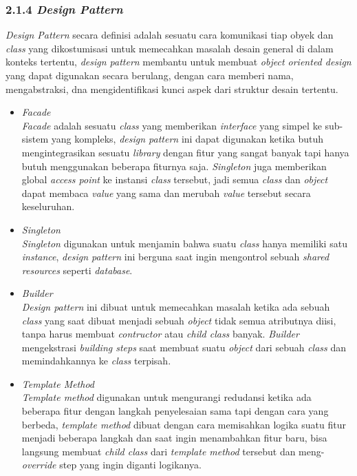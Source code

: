 \documentclass[a4paper]{article}
\newcommand{\subsubbab}[1]{%
    \subsubsection*{#1}%
    \addcontentsline{toc}{subsubsection}{\protect\numberline{}#1}%
}
\begin{document}
\subsubbab{2.1.4 \textit{Design Pattern}}
\textit{Design Pattern} secara definisi adalah sesuatu cara komunikasi tiap obyek dan \textit{class} yang dikostumisasi untuk memecahkan masalah desain general di dalam konteks tertentu, \textit{design pattern} membantu untuk membuat \textit{object oriented design} yang dapat digunakan secara berulang, dengan cara memberi nama, mengabstraksi, dna mengidentifikasi kunci aspek dari struktur desain tertentu\autocite{design-pattern-2588942}.
\begin{itemize}
    \item \textit{Facade}\\
          \textit{Facade} adalah sesuatu \textit{class} yang memberikan \textit{interface} yang simpel ke sub-sistem yang kompleks, \textit{design pattern} ini dapat digunakan ketika butuh mengintegrasikan sesuatu \textit{library} dengan fitur yang sangat banyak tapi hanya butuh menggunakan beberapa fiturnya saja\autocite{refactoring-guru}. \textit{Singleton} juga memberikan global \textit{access point} ke instansi \textit{class} tersebut, jadi semua \textit{class} dan \textit{object} dapat membaca \textit{value} yang sama dan merubah \textit{value} tersebut secara keseluruhan\autocite{refactoring-guru}.
    \item \textit{Singleton}\\
          \textit{Singleton} digunakan untuk menjamin bahwa suatu \textit{class} hanya memiliki satu \textit{instance}, \textit{design pattern} ini berguna saat ingin mengontrol sebuah \textit{shared resources} seperti \textit{database}\autocite{refactoring-guru}.
    \item \textit{Builder}\\
          \textit{Design pattern} ini dibuat untuk memecahkan masalah ketika ada sebuah \textit{class} yang saat dibuat menjadi sebuah \textit{object} tidak semua atributnya diisi, tanpa harus membuat \textit{contructor} atau \textit{child class} banyak. \textit{Builder} mengekstrasi \textit{building steps} saat membuat suatu \textit{object} dari sebuah \textit{class} dan memindahkannya ke \textit{class} terpisah\autocite{refactoring-guru}.
    \item \textit{Template Method}\\
          \textit{Template method} digunakan untuk mengurangi redudansi ketika ada beberapa fitur dengan langkah penyelesaian sama tapi dengan cara yang berbeda, \textit{template method} dibuat dengan cara memisahkan logika suatu fitur menjadi beberapa langkah dan saat ingin menambahkan fitur baru, bisa langsung membuat \textit{child class} dari \textit{template method} tersebut dan meng-\textit{override} step yang ingin diganti logikanya\autocite{refactoring-guru}.
\end{itemize}
\end{document}
